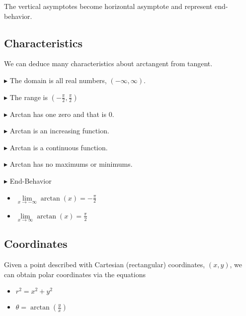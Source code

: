 \documentclass{ximera}
\begin{document}
The vertical asymptotes become horizontal asymptote and represent end-behavior. \\









\subsection{\textbf{\textcolor{purple!85!blue}{Characteristics}}} 

We can deduce many characteristics about arctangent from tangent.


$\blacktriangleright$ The domain is all real numbers, $(-\infty, \infty)$.


$\blacktriangleright$ The range is $\left( -\frac{\pi}{2}, \frac{\pi}{2} \right)$


$\blacktriangleright$ Arctan has one zero and that is $0$.


$\blacktriangleright$ Arctan is an increasing function.

$\blacktriangleright$ Arctan is a continuous function.

$\blacktriangleright$ Arctan has no maximums or minimums.


$\blacktriangleright$ End-Behavior





\begin{itemize}
  \item $\lim\limits_{x \to -\infty} \arctan(x) = -\frac{\pi}{2}$
  \item $\lim\limits_{x \to \infty} \arctan(x) = \frac{\pi}{2}$
\end{itemize}










\subsection{\textbf{\textcolor{purple!85!blue}{Coordinates}}} 

Given a point described with Cartesian (rectangular) coordinates, $(x, y)$, we can obtain polar coordinates via the equations


\begin{itemize}
\item $r^2 = x^2 + y^2$
\item $\theta = \arctan\left( \frac{y}{x} \right)$
\end{itemize}
\end{document}
